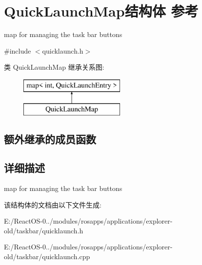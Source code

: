 \hypertarget{struct_quick_launch_map}{}\section{Quick\+Launch\+Map结构体 参考}
\label{struct_quick_launch_map}


map for managing the task bar buttons  




{\ttfamily \#include $<$quicklaunch.\+h$>$}

类 Quick\+Launch\+Map 继承关系图\+:\begin{figure}[H]
\begin{center}
\leavevmode
\includegraphics[height=2.000000cm]{struct_quick_launch_map}
\end{center}
\end{figure}
\subsection*{额外继承的成员函数}


\subsection{详细描述}
map for managing the task bar buttons 

该结构体的文档由以下文件生成\+:\begin{DoxyCompactItemize}
\item 
E\+:/\+React\+O\+S-\/0../modules/rosapps/applications/explorer-\/old/taskbar/quicklaunch.\+h\item 
E\+:/\+React\+O\+S-\/0../modules/rosapps/applications/explorer-\/old/taskbar/quicklaunch.\+cpp\end{DoxyCompactItemize}
